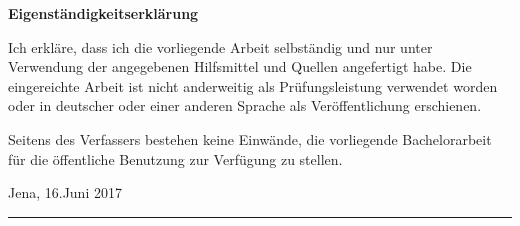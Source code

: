 \thispagestyle{empty}

\noindent
{\Large \bfseries Eigenständigkeitserklärung}
\vspace{\baselineskip}

\noindent
Ich erkläre, dass ich die vorliegende Arbeit selbständig und nur unter Verwendung der angegebenen
Hilfsmittel und Quellen angefertigt habe. Die eingereichte Arbeit ist nicht anderweitig als Prüfungsleistung
verwendet worden oder in deutscher oder einer anderen Sprache als Veröffentlichung erschienen.

\noindent
Seitens des Verfassers bestehen keine Einwände, die vorliegende
Bachelorarbeit für die öffentliche Benutzung zur Verfügung zu stellen.

\vspace{2\baselineskip}

\noindent
Jena, 16.Juni 2017

\noindent
\hfill\rule{0.4\textwidth}{0.5pt}\\
\hfill{}